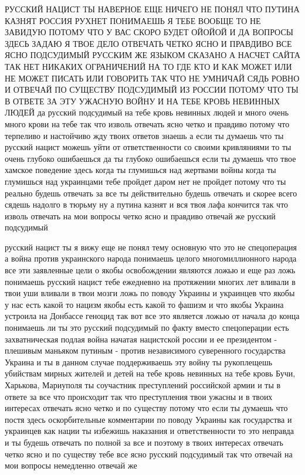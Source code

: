 РУССКИЙ НАЦИСТ ТЫ НАВЕРНОЕ ЕЩЕ НИЧЕГО НЕ ПОНЯЛ ЧТО ПУТИНА КАЗНЯТ РОССИЯ РУХНЕТ
ПОНИМАЕШЬ Я ТЕБЕ ВООБЩЕ ТО НЕ ЗАВИДУЮ ПОТОМУ ЧТО У ВАС СКОРО БУДЕТ ОЙОЙОЙ И ДА
ВОПРОСЫ ЗДЕСЬ ЗАДАЮ Я ТВОЕ ДЕЛО ОТВЕЧАТЬ ЧЕТКО ЯСНО И ПРАВДИВО ВСЕ ЯСНО
ПОДСУДИМЫЙ РУССКИМ ЖЕ ЯЗЫКОМ СКАЗАНО А НАСЧЕТ САЙТА ТАК НЕТ НИКАКИХ ОГРАНИЧЕНИЙ
НА ТО ГДЕ КТО И КАК МОЖЕТ ИЛИ НЕ МОЖЕТ ПИСАТЬ ИЛИ ГОВОРИТЬ ТАК ЧТО НЕ УМНИЧАЙ
СЯДЬ РОВНО И ОТВЕЧАЙ ПО СУЩЕСТВУ ПОДСУДИМЫЙ ИЗ РОССИИ ПОТОМУ ЧТО ТЫ В ОТВЕТЕ ЗА
ЭТУ УЖАСНУЮ ВОЙНУ И НА ТЕБЕ КРОВЬ НЕВИННЫХ ЛЮДЕЙ да русский подсудимый на тебе
кровь невинных людей и много очень много крови на тебе так что изволь отвечать
ясно четко и правдиво потому что терпеливо и настойчиво жду твоих ответов
знаешь а если ты думаешь что ты русский нацист можешь уйти от ответственности
со своими кривляниями то ты очень глубоко ошибаешься да ты глубоко ошибаешься
если ты думаешь что твое хамское поведение здесь когда ты глумишься над
жертвами войны когда ты глумишься над украинцами тебе пройдет даром нет не
пройдет потому что ты реально будешь отвечать за все ты действительно будешь
отвечать и скорее всего сядешь надолго в тюрьму ну а путина казнят и вся твоя
лафа кончится так что изволь отвечать на мои вопросы четко ясно и правдиво
отвечай же русский подсудимый

русский нацист ты я вижу еще не понял тему основную что это не спецоперация а
война против украинского народа понимаешь целого многомиллионного народа все
эти заявленные цели о якобы освобождении являются ложью и еще раз ложь
понимаешь русский нацист тебе ежедневно на протяжении многих лет вливали в твои
уши вливали в твои мозги ложь по поводу Украины и украинцев что якобы у нас
есть какой то нацизм якобы есть какой то фашизм и что якобы Украина устроила на
Донбассе геноцид так вот все это является ложью от начала до конца понимаешь ли
ты это русский подсудимый по факту вместо спецоперации есть захватническая
подлая война начатая нацистской россии и ее президентом - плешивым маньяком
путиным - против независимого суверенного государства Украина и ты в данном
случае поддерживаешь эту войну ты рукоплещешь убийствам мирных жителей и детей
на тебе кровь невинных на тебе кровь Бучи, Харькова, Мариуполя ты соучастник
преступлений российской армии и ты в ответе за все что происходит так что
преступления твои ужасны и в твоих интересах отвечать ясно четко и по существу
потому что если ты думаешь что постя здесь оскорбительные комментарии по поводу
Украины как государства и украинцев как нации ты избежишь наказания и
ответственности то это неправда и ты будешь отвечать по полной за все и поэтому
в твоих интересах отвечать четко ясно и по существу тебе все ясно русский
подсудимый так что отвечай на мои вопросы немедленно отвечай же

